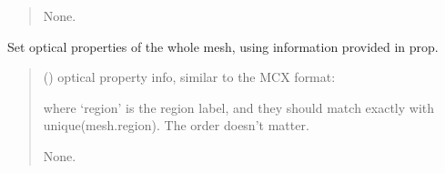 \documentclass[letterpaper,10pt,english]{sphinxmanual}
\begin{document}
\begin{fulllineitems}
\begin{fulllineitems}
\begin{quote}
\begin{description}
\sphinxAtStartPar
None.

\end{description}\end{quote}

\end{fulllineitems}


\begin{fulllineitems}
\label{\detokenize{_autosummary/nirfasterff.base.dcs_mesh.dcsmesh:nirfasterff.base.dcs_mesh.dcsmesh.set_prop}}
\pysigstartsignatures
\pysiglinewithargsret
{}
{}
{}
\pysigstopsignatures
\sphinxAtStartPar
Set optical properties of the whole mesh, using information provided in prop.
\begin{quote}\begin{description}
\sphinxAtStartPar
{} () \textendash{} 
\sphinxAtStartPar
optical property info, similar to the MCX format:

\begin{sphinxVerbatim}[commandchars=\\\{\}]
\PYG{p}{[}     \PYG{p}{]}
\PYG{p}{[}     \PYG{p}{]}
\PYG{p}{[}\PYG{p}{]}
\end{sphinxVerbatim}

\sphinxAtStartPar
where ‘region’ is the region label, and they should match exactly with unique(mesh.region). The order doesn’t matter.


\sphinxAtStartPar
None.

\end{description}\end{quote}

\end{fulllineitems}


\end{fulllineitems}
\end{document}

